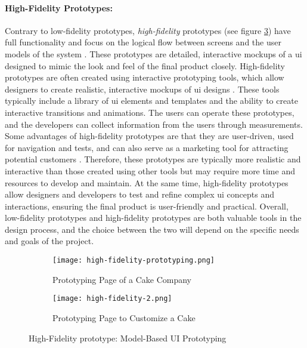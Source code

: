 \paragraph*{High-Fidelity Prototypes:}
Contrary to low-fidelity prototypes, \textit{high-fidelity} prototypes (see figure \ref{fig:background:uiPrototyping}) have full functionality and focus on the logical flow between screens and the user models of the system \cite{article:prototyping:exploratory}.
These prototypes are detailed, interactive mockups of a \ac{ui} designed to mimic the look and feel of the final product closely.
High-fidelity prototypes are often created using interactive prototyping tools, which allow designers to create realistic, interactive mockups of \ac{ui} designs \cite{article:prototyping:weichbroth}. 
These tools typically include a library of \ac{ui} elements and templates and the ability to create interactive transitions and animations.
The users can operate these prototypes, and the developers can collect information from the users through measurements.
Some advantages of high-fidelity prototypes are that they are user-driven, used for navigation and tests, and can also serve as a marketing tool for attracting potential customers \cite{article:prototyping:highlowfidelity}.
Therefore, these prototypes are typically more realistic and interactive than those created using other tools but may require more time and resources to develop and maintain.
At the same time, high-fidelity prototypes allow designers and developers to test and refine complex \ac{ui} concepts and interactions, ensuring the final product is user-friendly and practical.
Overall, low-fidelity prototypes and high-fidelity prototypes are both valuable tools in the design process, and the choice between the two will depend on the specific needs and goals of the project.
\begin{figure}[htbp]
  \begin{subfigure}[b]{0.5\textwidth}
    \centering
    \texttt{[image: high-fidelity-prototyping.png]}
    \caption{Prototyping Page of a Cake Company}
    \label{fig:background:high1}   
  \end{subfigure}
  \begin{subfigure}[b]{0.5\textwidth}
    \centering
    \texttt{[image: high-fidelity-2.png]}
    \caption{Prototyping Page to Customize a Cake}
    \label{fig:background:high2}   
  \end{subfigure} 
  \caption[High-Fidelity Prototyping]{High-Fidelity prototype: Model-Based UI Prototyping \cite{misc:prototyping:hfp}}
  \label{fig:background:uiPrototyping}
\end{figure}

